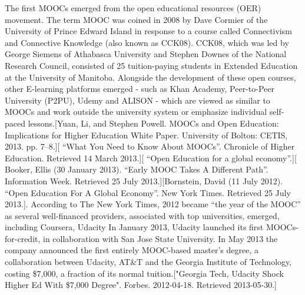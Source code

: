 The first MOOCs emerged from the open educational resources (OER) movement. The term MOOC was coined in 2008 by Dave Cormier of the University of Prince Edward Island in response to a course called Connectivism and Connective Knowledge (also known as CCK08). CCK08, which was led by George Siemens of Athabasca University and Stephen Downes of the National Research Council, consisted of 25 tuition-paying students in Extended Education at the University of Manitoba.
Alongside the development of these open courses, other E-learning platforms emerged - such as Khan Academy, Peer-to-Peer University (P2PU), Udemy and ALISON - which are viewed as similar to MOOCs and work outside the university system or emphasize individual self-paced lessons.[Yuan, Li, and Stephen Powell. MOOCs and Open Education: Implications for Higher Education White Paper. University of Bolton: CETIS, 2013. pp. 7–8.][ “What You Need to Know About MOOCs”. Chronicle of Higher Education. Retrieved 14 March 2013.][ “Open Education for a global economy”.][ Booker, Ellis (30 January 2013). “Early MOOC Takes A Different Path”. Information Week. Retrieved 25 July 2013.][Bornstein, David (11 July 2012). “Open Education For A Global Economy”. New York Times. Retrieved 25 July 2013.].
According to The New York Times, 2012 became “the year of the MOOC” as several well-financed providers, associated with top universities, emerged, including Coursera, Udacity
In January 2013, Udacity launched its first MOOCs-for-credit, in collaboration with San Jose State University. In May 2013 the company announced the first entirely MOOC-based master's degree, a collaboration between Udacity, AT\&T and the Georgia Institute of Technology, costing \$7,000, a fraction of its normal tuition.["Georgia Tech, Udacity Shock Higher Ed With \$7,000 Degree". Forbes. 2012-04-18. Retrieved 2013-05-30.]
